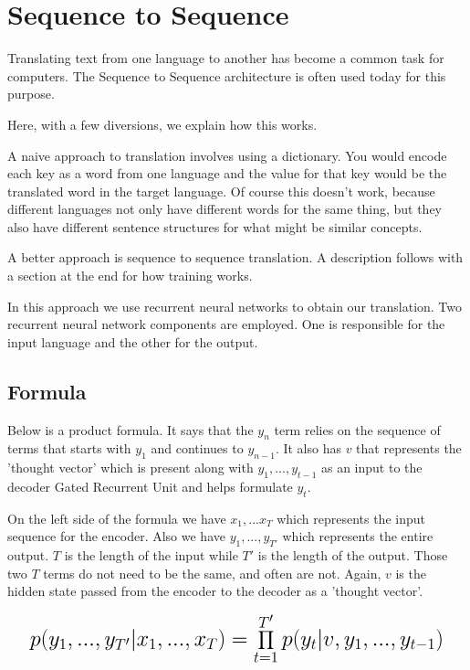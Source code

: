 \section{Sequence to Sequence}

Translating text from one language to another has become a common task for computers. The Sequence to Sequence architecture is often used today for this purpose.

Here, with a few diversions, we explain how this works.

A naive approach to translation involves using a dictionary. You would encode each key as a word from one language and the value for that key would be the translated word in the target language. Of course this doesn't work, because different languages not only have different words for the same thing, but they also have different sentence structures for what might be similar concepts.

A better approach is sequence to sequence translation. A description follows with a section at the end for how training works.

In this approach we use recurrent neural networks to obtain our translation. Two recurrent neural network components are employed. One is responsible for the input language and the other for the output. 




\subsection*{Formula}
Below is a product formula. It says that the $y_n$ term relies on the sequence of terms that starts with $y_1$ and continues to $y_{n-1}$. It also has $v$ that represents the 'thought vector' which is present along with $y_1,...,y_{t-1}$ as an input to the decoder Gated Recurrent Unit and helps formulate $y_t$.

On the left side of the formula we have $x_1,...x_T$ which represents the input sequence for the encoder. Also we have $y_1,...,y_{T'}$ which represents the entire output. $T$ is the length of the input while $T'$ is the length of the output. Those two $T$ terms do not need to be the same, and often are not. Again, $v$ is the hidden state passed from the encoder to the decoder as a 'thought vector'.

\[
\mathlarger{ \mathlarger{ \mathlarger{
			p(y_1,...,y_{T'}|x_1,...,x_T) = \prod_{t=1}^{T'} p(y_t|v,y_1,..., y_{t-1}) 
} } }
\]

